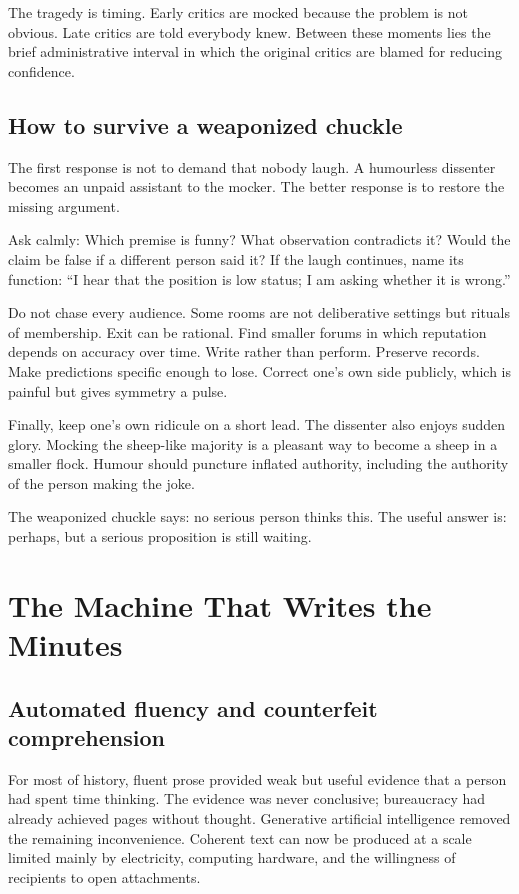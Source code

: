 \documentclass[12pt,a4paper]{book}
\begin{document}
The tragedy is timing.  Early critics are mocked because the problem is not
obvious.  Late critics are told everybody knew.  Between these moments lies the
brief administrative interval in which the original critics are blamed for
reducing confidence.

\section{How to survive a weaponized chuckle}

The first response is not to demand that nobody laugh.  A humourless dissenter
becomes an unpaid assistant to the mocker.  The better response is to restore
the missing argument.

Ask calmly: Which premise is funny?  What observation contradicts it?  Would
the claim be false if a different person said it?  If the laugh continues,
name its function: ``I hear that the position is low status; I am asking whether
it is wrong.''

Do not chase every audience.  Some rooms are not deliberative settings but
rituals of membership.  Exit can be rational.  Find smaller forums in which
reputation depends on accuracy over time.  Write rather than perform.  Preserve
records.  Make predictions specific enough to lose.  Correct one's own side
publicly, which is painful but gives symmetry a pulse.

Finally, keep one's own ridicule on a short lead.  The dissenter also enjoys
sudden glory.  Mocking the sheep-like majority is a pleasant way to become a
sheep in a smaller flock.  Humour should puncture inflated authority, including
the authority of the person making the joke.

The weaponized chuckle says: no serious person thinks this.  The useful answer
is: perhaps, but a serious proposition is still waiting.

\chapter{The Machine That Writes the Minutes}
\label{chap:machine-minutes}

\section{Automated fluency and counterfeit comprehension}

For most of history, fluent prose provided weak but useful evidence that a
person had spent time thinking.  The evidence was never conclusive; bureaucracy
had already achieved pages without thought.  Generative artificial intelligence
removed the remaining inconvenience.  Coherent text can now be produced at a
scale limited mainly by electricity, computing hardware, and the willingness
of recipients to open attachments.
\end{document}
